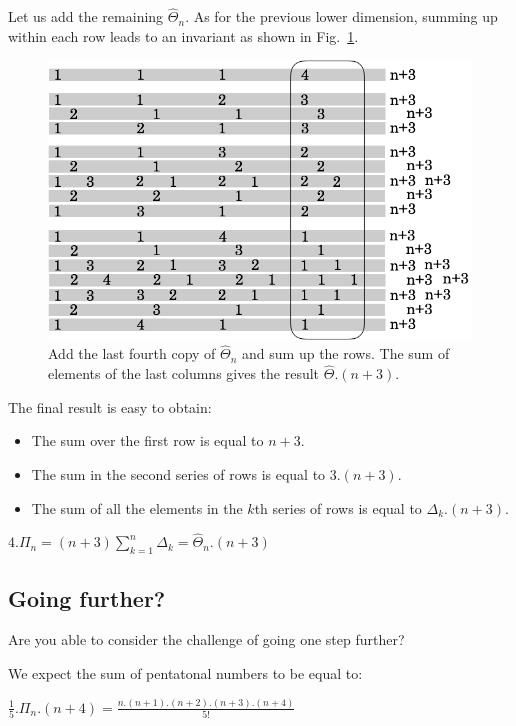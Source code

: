 Let us add the remaining $\widehat{\Theta}_n$.
As for the previous lower dimension, summing up within each row leads to an invariant as shown in Fig.~\ref{fig:Tetrahedral5}.
\begin{figure}[h]
\begin{center}
        \includegraphics[scale=0.36]{FiguresArithmetic/appTetrahedral5}
        \caption{Add the last fourth copy of $\widehat{\Theta}_n$ and sum up the rows. The sum of elements of the last columns gives the result $\widehat{\Theta}.(n+3)$.}
        \label{fig:Tetrahedral5}
\end{center}
\end{figure}
The final result is easy to obtain:
\begin{itemize}
\item 
The sum over the first row is equal to $n+3$.
\item
The sum in the second series of rows is equal to $3.(n+3)$. 
\item
The sum of all the elements in the $k$th series of rows is equal to
$\Delta_k.(n+3)$.
\end{itemize}
$4.\Pi_n = (n+3) \sum_{k=1}^{n} \Delta_k = \widehat{\Theta}_n.(n+3)$


\subsection{Going further?}

Are you able to consider the challenge of going one step further?

We expect the sum of pentatonal numbers to be equal to:

$\frac{1}{5}.\Pi_n.(n+4) = \frac{n.(n+1).(n+2).(n+3).(n+4)}{5!}$


